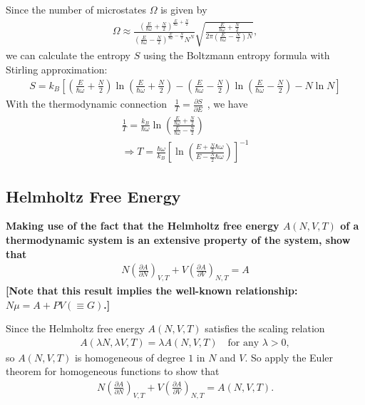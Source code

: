 \documentclass[../../main.tex]{subfiles}
\begin{document}
\begin{enumerate}
  Since the number of microstates $\Omega$ is given by
  \begin{align*}
    \Omega\approx 
    \frac{(\frac{E}{\hbar\omega} + \frac{N}{2})^{\frac{E}{\hbar\omega} + \frac{N}{2}}}
    {(\frac{E}{\hbar\omega} - \frac{N}{2})^{\frac{E}{\hbar\omega} - \frac{N}{2}}N^{N}}
    \sqrt{\frac{\frac{E}{\hbar\omega} + \frac{N}{2}}{2\pi(\frac{E}{\hbar\omega} - \frac{N}{2})N}},
  \end{align*}
  we can calculate the entropy $S$ using the Boltzmann entropy formula with Stirling approximation:
  \begin{align*}
    \boxed{S = k_{B}\left[
        \left(\frac{E}{\hbar\omega}+\frac{N}{2}\right)\ln{\left(\frac{E}{\hbar\omega}+\frac{N}{2}\right)}
      - \left(\frac{E}{\hbar\omega}-\frac{N}{2}\right)\ln{\left(\frac{E}{\hbar\omega}-\frac{N}{2}\right)}
      - N\ln{N}
      \right]}
  \end{align*}
  With the thermodynamic connection $\begin{aligned}
    \frac{1}{T} = \frac{\partial S}{\partial E}
  \end{aligned}$, we have
  \begin{align*}
    \frac{1}{T} = \frac{k_{B}}{\hbar\omega}
    \ln{\left(
      \frac{\frac{E}{\hbar\omega}+\frac{N}{2}}
      {\frac{E}{\hbar\omega}-\frac{N}{2}}
      \right)}\\
      \Rightarrow \boxed{
        T = \frac{\hbar\omega}{k_{B}}\left[\ln{\left(
          \frac{E + \frac{N}{2}\hbar\omega}{E - \frac{N}{2}\hbar\omega}
          \right)}\right]^{-1}
      }
  \end{align*}
  \end{enumerate}
  


\subsection{Helmholtz Free Energy}
\textbf{Making use of the fact that the Helmholtz free energy $A(N,V,T)$ of a thermodynamic system is an extensive property of the system, show that
  \begin{align*}
    N\left(\frac{\partial A}{\partial N}\right)_{V,T} + V\left(\frac{\partial A}{\partial V}\right)_{N,T} = A
  \end{align*}
  [Note that this result implies the well-known relationship: $N\mu = A + PV(\equiv G)$.]}

  Since the Helmholtz free energy $A(N,V,T)$ satisfies the scaling relation
  \begin{align*}
    A(\lambda N, \lambda V, T) = \lambda A(N,V,T) \quad \text{for any } \lambda > 0,
  \end{align*}
  so $A(N,V,T)$ is homogeneous of degree $1$ in $N$ and $V$. So apply the Euler theorem for homogeneous functions to show that
  \begin{align*}
    N\left(\frac{\partial A}{\partial N}\right)_{V,T} + V\left(\frac{\partial A}{\partial V}\right)_{N,T} = A(N,V,T).
  \end{align*} 
\end{document}
